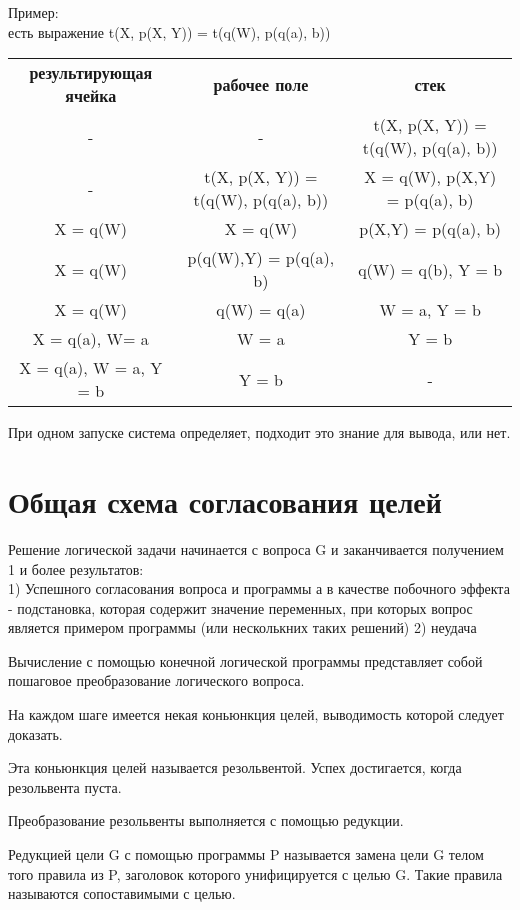 Пример:\\
есть выражение t(X, p(X, Y)) = t(q(W), p(q(a), b))
\begin{table}[ph!]
  \begin{center}
    \begin{tabular}{c|c|c}
 	\textbf{результирующая ячейка}  & \textbf{рабочее поле} & \textbf{стек}\\
	- & - & t(X, p(X, Y)) = t(q(W), p(q(a), b))\\
	- &  t(X, p(X, Y)) = t(q(W), p(q(a), b)) & X = q(W), p(X,Y) = p(q(a), b) \\
	X = q(W) & X = q(W)  & p(X,Y) = p(q(a), b)\\ %
	X = q(W) & p(q(W),Y) = p(q(a), b) & q(W) = q(b), Y = b\\
	X = q(W) & q(W) = q(a) & W = a, Y = b\\
	X = q(a), W= a& W = a & Y = b\\
	X = q(a), W = a, Y = b & Y = b & -\\
      \hline	
    \end{tabular}
  \end{center}
\end{table}

При одном запуске система определяет, подходит это знание для вывода, или нет.

\section{Общая схема согласования целей}
Решение логической задачи начинается с вопроса G и заканчивается получением 1 и более результатов:\\
1) Успешного согласования вопроса и программы а в качестве побочного эффекта - подстановка, которая содержит значение переменных, при которых вопрос является примером программы (или несколькних таких решений)
2) неудача 

Вычисление с помощью конечной логической программы представляет собой пошаговое преобразование логического вопроса. 

На каждом шаге имеется некая коньюнкция целей, выводимость которой следует доказать. 

Эта коньюнкция целей называется резольвентой. Успех достигается, когда резольвента пуста.

Преобразование резольвенты выполняется с помощью редукции.

Редукцией цели G с помощью программы P называется замена цели G телом того правила из P, заголовок которого унифицируется с целью G. Такие правила называются сопоставимыми с целью.

